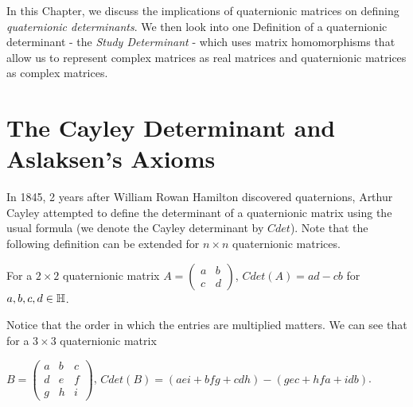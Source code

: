 In this Chapter, we discuss the implications of quaternionic matrices on defining \emph{quaternionic determinants}. We then look into one Definition of a quaternionic determinant - the \emph{Study Determinant} - which uses matrix homomorphisms that allow us to represent complex matrices as real matrices and quaternionic matrices as complex matrices. 

\section{The Cayley Determinant and Aslaksen's Axioms} \label{cayley}

In 1845, 2 years after William Rowan Hamilton discovered quaternions, Arthur Cayley attempted to define the determinant of a quaternionic matrix using the usual formula (we denote the Cayley determinant by $Cdet$). Note that the following definition can be extended for $n\times n$ quaternionic matrices.

\begin{definition}
 \emph{\cite{aslaksen}} For a $2 \times 2$ quaternionic matrix \newline $A =  \begin{pmatrix} a & b \\ c & d \end{pmatrix}$, $Cdet(A) = ad - cb$ for $a,b,c,d \in \operatorname{\mathbb{H}}$. 
\end{definition}
 
 Notice that the order in which the entries are multiplied matters. We can see that for a $3\times 3$ quaternionic matrix 

 $B = 
\begin{pmatrix}
a & b & c \\
d & e & f \\
g & h & i
\end{pmatrix}$, $Cdet(B) = (aei+bfg+cdh)-(gec+hfa+idb)$.
 

